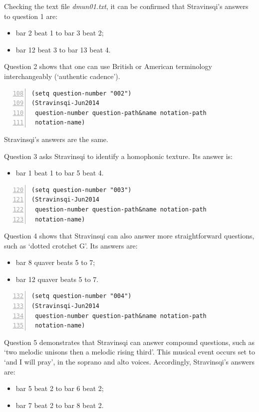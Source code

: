 \noindent Checking the text file \emph{dmun01.txt},
it can be confirmed that Stravinsqi's answers to
question 1 are:
\begin{itemize}
\item bar 2 beat 1 to bar 3 beat 2;
\item bar 12 beat 3 to bar 13 beat 4.
\end{itemize}

Question 2 shows that one can use British or American
terminology interchangeably (`authentic cadence').

\begin{Verbatim}[frame=single,numbers=left,firstnumber=108]
(setq question-number "002")
(Stravinsqi-Jun2014
 question-number question-path&name notation-path
 notation-name)
\end{Verbatim}

\noindent Stravinsqi's answers are the same.

Question 3 asks Stravinsqi to identify a
homophonic texture. Its answer is:
\begin{itemize}
\item bar 1 beat 1 to bar 5 beat 4.
\end{itemize}

\begin{Verbatim}[frame=single,numbers=left,firstnumber=120]
(setq question-number "003")
(Stravinsqi-Jun2014
 question-number question-path&name notation-path
 notation-name)
\end{Verbatim}
 
Question 4 shows that Stravinsqi can also answer
more straightforward questions, such as `dotted
crotchet G'. Its answers are:
\begin{itemize}
\item bar 8 quaver beats 5 to 7;
\item bar 12 quaver beats 5 to 7.
\end{itemize}

\begin{Verbatim}[frame=single,numbers=left,firstnumber=132]
(setq question-number "004")
(Stravinsqi-Jun2014
 question-number question-path&name notation-path
 notation-name)
 \end{Verbatim}

Question 5 demonstrates that Stravinsqi can answer
compound questions, such as `two melodic unisons then
a melodic rising third'. This musical event occurs
set to `and I will pray', in the soprano and alto
voices. Accordingly, Stravinsqi's answers are:
\begin{itemize}
\item bar 5 beat 2 to bar 6 beat 2;
\item bar 7 beat 2 to bar 8 beat 2.
\end{itemize}

